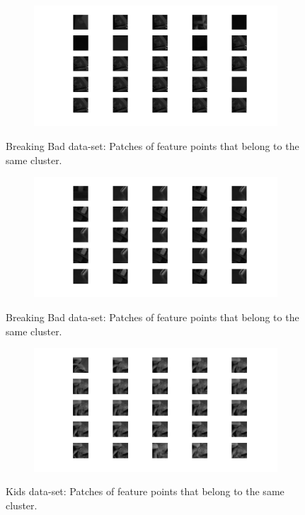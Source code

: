 \documentclass{paper}
\begin{document}
\begin{figure}[H]
\centering
\begin{subfigure}{1.0\textwidth}
\includegraphics[width=\textwidth]{figures/vocabulary/bb/bbVoca122}
\end{subfigure}
\caption{Breaking Bad data-set: Patches of feature points that belong to the same cluster.}
\label{fig:bb_word_1}
\end{figure}

\begin{figure}[H]
\centering
\begin{subfigure}{1.0\textwidth}
\includegraphics[width=\textwidth]{figures/vocabulary/bb/bbVoca1174}
\end{subfigure}
\caption{Breaking Bad data-set: Patches of feature points that belong to the same cluster.}
\label{fig:bb_word_2}
\end{figure}

\begin{figure}[H]
\centering
\begin{subfigure}{1.0\textwidth}
\includegraphics[width=\textwidth]{figures/vocabulary/kids/voca888}
\end{subfigure}
\caption{Kids data-set: Patches of feature points that belong to the same cluster.}
\label{fig:kids_word_1}
\end{figure}
\end{document}
